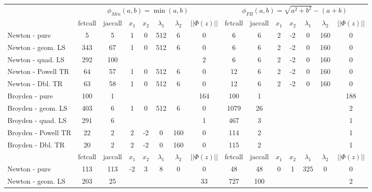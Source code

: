 \documentclass[11pt, a4paper]{article}
\begin{document}
\begin{table}[htb!]

\begin{scriptsize}
\begin{tabular}{l|ccccccc|ccccccc}
 & \multicolumn{7}{c|}{$\phi_{Min}(a,b)=\min(a,b)$} & \multicolumn{7}{c}{$\phi_{FB}(a,b)=\sqrt{a^2+b^2} -(a+b)$} \\
   &  fctcall  &  jaccall  &  $x_1$  &  $x_2$  &  $\lambda_1$  &  $\lambda_2$  &  $||\Phi(z)||$  &  fctcall  &  jaccall  &  $x_1$  &  $x_2$  &  $\lambda_1$  &  $\lambda_2$  &  $||\Phi(z)||$ \\ 
\hline   
Newton - pure  &   5  &  5  &  1  &  0  &  512  &  6  &  0  &  6  &  6  &  2  &  -2  &  0  &  160  &  0 \\ 
Newton - geom. LS  &   343  &  67  &  1  &  0  &  512  &  6  &  0  &  6  &  6  &  2  &  -2  &  0  &  160  &  0 \\ 
Newton - quad. LS  &   292  &  100  &    &    &    &    &  2  &  6  &  6  &  2  &  -2  &  0  &  160  &  0 \\ 
Newton - Powell TR  &   64  &  57  &  1  &  0  &  512  &  6  &  0  &  12  &  6  &  2  &  -2  &  0  &  160  &  0 \\ 
Newton - Dbl. TR  &   63  &  58  &  1  &  0  &  512  &  6  &  0  &  12  &  6  &  2  &  -2  &  0  &  160  &  0 \\ 
Broyden - pure  &   100  &  1  &    &    &    &    &  164  &  100  &  1  &    &    &    &    &  188 \\ 
Broyden - geom. LS  &   403  &  6  &  1  &  0  &  512  &  6  &  0  &  1079  &  26  &    &    &    &    &  2 \\ 
Broyden - quad. LS  &   291  &  6  &    &    &    &    &  1  &  467  &  3  &    &    &    &    &  1 \\ 
Broyden - Powell TR  &   22  &  2  &  2  &  -2  &  0  &  160  &  0  &  114  &  2  &    &    &    &    &  1 \\ 
Broyden - Dbl. TR  &   20  &  2  &  2  &  -2  &  0  &  160  &  0  &  115  &  2  &    &    &    &    &  1 \\ 
\hline
   &  fctcall  &  jaccall  &  $x_1$  &  $x_2$  &  $\lambda_1$  &  $\lambda_2$  &  $||\Phi(z)||$  &  fctcall  &  jaccall  &  $x_1$  &  $x_2$  &  $\lambda_1$  &  $\lambda_2$  &  $||\Phi(z)||$ \\ 
\hline   
Newton - pure  &   113  &  113  &  -2  &  3  &  8  &  0  &  0  &  48  &  48  &  0  &  1  &  325  &  0  &  0 \\ 
Newton - geom. LS  &   203  &  25  &    &    &    &    &  33  &  727  &  100  &    &    &    &    &  2 \\ 

\end{tabular}
\end{scriptsize}
\end{table}
\end{document}
